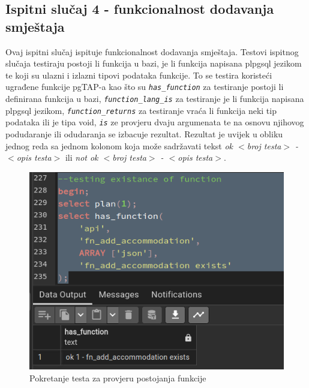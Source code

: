 				\subsection{Ispitni slučaj 4 - funkcionalnost dodavanja smještaja}
				Ovaj ispitni slučaj ispituje funkcionalnost dodavanja smještaja. Testovi ispitnog slučaja testiraju postoji li funkcija u bazi, je li funkcija napisana plpgsql jezikom te koji su ulazni i izlazni tipovi podataka funkcije. To se testira koristeći ugrađene funkcije pgTAP-a kao što su \textit{\texttt{has\_function}} za testiranje postoji li definirana funkcija u bazi, \textit{\texttt{function\_lang\_is}} za testiranje je li funkcija napisana plpgsql jezikom, \textit{\texttt{function\_returns}} za testiranje vraća li funkcija neki tip podataka ili je tipa void, \textit{\texttt{is\(\)}} ze provjeru dvaju argumenata te na osnovu njihovog podudaranje ili odudaranja se izbacuje rezultat. Rezultat je uvijek u obliku jednog reda sa jednom kolonom koja može sadržavati tekst \textit{ok $<$broj testa$>$ - $<$opis testa$>$} ili \textit{not ok $<$broj testa$>$ - $<$opis testa$>$}.
				\begin{figure}[H]
					\centering
					\includegraphics[width=\textwidth]{slike/unit_tests/ut_4/has_func.png}
					\caption{Pokretanje testa za provjeru postojanja funkcije}
					\label{fig: IS4-has_function}
				\end{figure}

